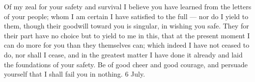 

 Of my zeal for your safety and survival I believe you have learned from the letters of your people; whom I am certain I have satisfied to the full --- nor do I yield to them, though their goodwill toward you is singular, in wishing you safe. They for their part have no choice but to yield to me in this, that at the present moment I can do more for you than they themselves can; which indeed I have not ceased to do, nor shall I cease, and in the greatest matter I have done it already and laid the foundations of your safety. Be of good cheer and good courage, and persuade yourself that I shall fail you in nothing. 6 July.
